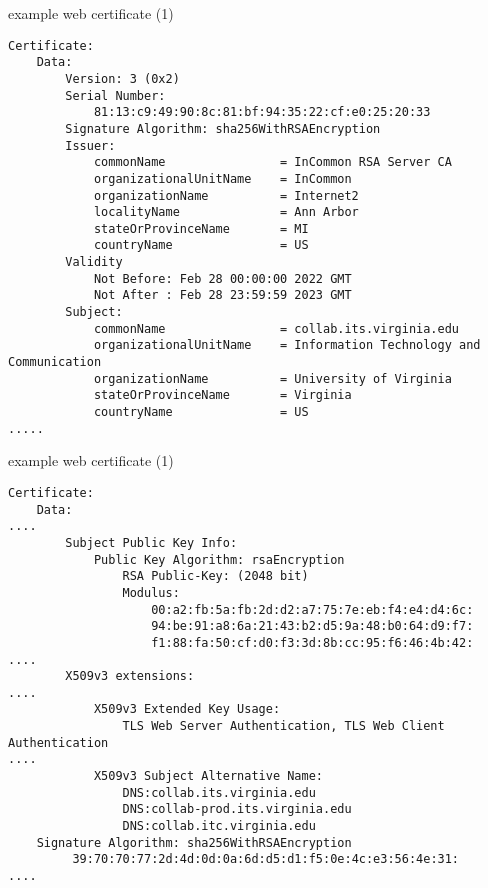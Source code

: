 \begin{frame}[fragile]{example web certificate (1)}
\begin{Verbatim}[fontsize=\scriptsize]
Certificate:
    Data:
        Version: 3 (0x2)
        Serial Number:
            81:13:c9:49:90:8c:81:bf:94:35:22:cf:e0:25:20:33
        Signature Algorithm: sha256WithRSAEncryption
        Issuer:
            commonName                = InCommon RSA Server CA
            organizationalUnitName    = InCommon
            organizationName          = Internet2
            localityName              = Ann Arbor
            stateOrProvinceName       = MI
            countryName               = US
        Validity
            Not Before: Feb 28 00:00:00 2022 GMT
            Not After : Feb 28 23:59:59 2023 GMT
        Subject:
            commonName                = collab.its.virginia.edu
            organizationalUnitName    = Information Technology and Communication
            organizationName          = University of Virginia
            stateOrProvinceName       = Virginia
            countryName               = US
.....
\end{Verbatim}
\end{frame}

\begin{frame}[fragile]{example web certificate (1)}
\begin{Verbatim}[fontsize=\scriptsize]
Certificate:
    Data:
....
        Subject Public Key Info:
            Public Key Algorithm: rsaEncryption
                RSA Public-Key: (2048 bit)
                Modulus:
                    00:a2:fb:5a:fb:2d:d2:a7:75:7e:eb:f4:e4:d4:6c:
                    94:be:91:a8:6a:21:43:b2:d5:9a:48:b0:64:d9:f7:
                    f1:88:fa:50:cf:d0:f3:3d:8b:cc:95:f6:46:4b:42:
....
        X509v3 extensions:
....
            X509v3 Extended Key Usage: 
                TLS Web Server Authentication, TLS Web Client Authentication
....
            X509v3 Subject Alternative Name: 
                DNS:collab.its.virginia.edu
                DNS:collab-prod.its.virginia.edu
                DNS:collab.itc.virginia.edu
    Signature Algorithm: sha256WithRSAEncryption
         39:70:70:77:2d:4d:0d:0a:6d:d5:d1:f5:0e:4c:e3:56:4e:31:
....
\end{Verbatim}
\end{frame}

